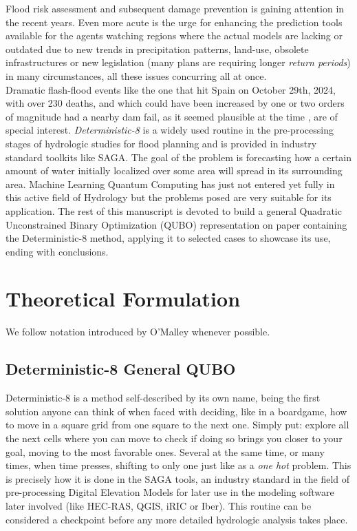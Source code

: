 \documentclass[%
 reprint,
 amsmath,amssymb,
 aps,
]{revtex4-2}
\begin{document}
Flood risk assessment and subsequent damage prevention is gaining attention in the recent years. Even more acute is the urge for enhancing the prediction tools available for the agents watching regions where the actual models are lacking or outdated due to new trends in precipitation patterns, land-use, obsolete infrastructures or new legislation (many plans are requiring longer \textit{return periods}) in many circumstances, all these issues concurring all at once. \\
Dramatic flash-flood events like the one that hit Spain on October 29th, 2024, with over 230 deaths, and which could have been increased by one or two orders of magnitude had a nearby dam fail, as it seemed plausible at the time \cite{CalvoSancho2026}, are of special interest. \textit{Deterministic-8} is a widely used routine in the pre-processing stages of hydrologic studies for flood planning and is provided in industry standard toolkits like SAGA\cite{Saga}. The goal of the problem is forecasting how a certain amount of water initially localized over some area will spread in its surrounding area. Machine Learning Quantum Computing\cite{combarro2023practical,combarro2025practical} has just not entered yet fully in this active field of Hydrology but the problems posed are very suitable for its application. 
The rest of this manuscript is devoted to build a general Quadratic Unconstrained Binary Optimization (QUBO) representation on paper containing the Deterministic-8 method, applying it to selected cases to showcase its use, ending with conclusions.

\section{\label{sec:level2}Theoretical Formulation}

We follow notation introduced by O’Malley\cite{OMalley2018} whenever possible.

\subsection{\label{sec:level2}Deterministic-8 General QUBO}
Deterministic-8 is a method self-described by its own name, being the first solution anyone can think of when faced with deciding, like in a boardgame, how to move in a square grid from one square to the next one. Simply put: explore all the next cells where you can move to check if doing so brings you closer to your goal, moving to the most favorable ones. Several at the same time, or many times, when time presses, shifting to only one just like as a \textit{one hot} problem. This is precisely how it is done in the SAGA tools\cite{Saga}, an industry standard in the field of pre-processing Digital Elevation Models for later use in the modeling software later involved (like HEC-RAS\cite{hec_ras_manual}, QGIS, iRIC or Iber). This routine can be considered a checkpoint before any more detailed hydrologic analysis takes place.
\end{document}
